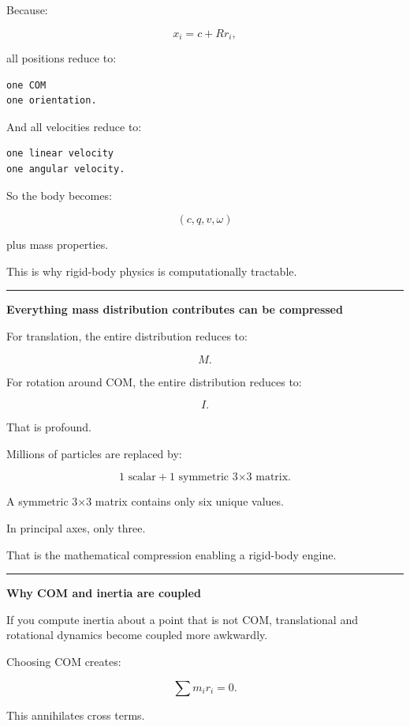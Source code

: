 Because:

\[
x_i
=
c+
Rr_i,
\]

all positions reduce to:

\begin{verbatim}
one COM
one orientation.
\end{verbatim}

And all velocities reduce to:

\begin{verbatim}
one linear velocity
one angular velocity.
\end{verbatim}

So the body becomes:

\[
\boxed{
(c,q,v,\omega)
}
\]

plus mass properties.

This is why rigid-body physics is computationally tractable.

\begin{center}\rule{0.5\linewidth}{0.5pt}\end{center}

\textbf{Everything mass distribution contributes can be compressed}

For translation, the entire distribution reduces to:

\[
M.
\]

For rotation around COM, the entire distribution reduces to:

\[
I.
\]

That is profound.

Millions of particles are replaced by:

\[
1\text{ scalar}
+
1\text{ symmetric 3×3 matrix}.
\]

A symmetric 3×3 matrix contains only six unique values.

In principal axes, only three.

That is the mathematical compression enabling a rigid-body engine.

\begin{center}\rule{0.5\linewidth}{0.5pt}\end{center}

\textbf{Why COM and inertia are coupled}

If you compute inertia about a point that is not COM, translational and rotational dynamics become coupled more awkwardly.

Choosing COM creates:

\[
\sum m_ir_i=0.
\]

This annihilates cross terms.

